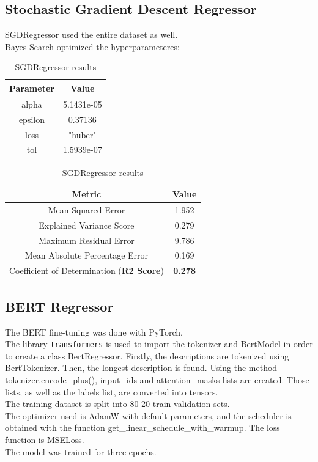 \documentclass[times, utf8, zavrsni, english]{fer}
\begin{document}
\subsection{Stochastic Gradient Descent Regressor}
SGDRegressor used the entire dataset as well. \\
Bayes Search optimized the hyperparameteres:
\begin{table}[h!]
	\parbox{.45\linewidth}{
		\centering
		\begin{tabular}{|| c | c ||} 
			\hline
			Parameter & Value \\ [0.5ex] 
			\hline\hline
			alpha & 5.1431e-05  \\ \hline
			epsilon & 0.37136 \\ \hline
			loss & "huber" \\ \hline
			tol & 1.5939e-07  \\ 
			\hline
		\end{tabular}
		\caption{Hyperparameteres for SGDRegressor}
		\label{table:7}
	}
	\parbox{.45\linewidth}{
		\centering
		\begin{tabular}{|| c | c ||} 
			\hline
			Metric & Value \\ [0.5ex] 
			\hline\hline
			Mean Squared Error & 1.952  \\ \hline
			Explained Variance Score & 0.279\\ \hline
			Maximum Residual Error & 9.786 \\ \hline
			Mean Absolute Percentage Error & 0.169 \\ \hline
			Coefficient of Determination (\textbf{R2 Score}) & \textbf{0.278} \\
			\hline
		\end{tabular}
		\caption{SGDRegressor results}
		\label{table:8}
	}
\end{table}
\subsection{BERT Regressor}
The BERT fine-tuning was done with PyTorch.\\
The library \texttt{transformers} is used to import the tokenizer and BertModel in order to create a class BertRegressor.
Firstly, the descriptions are tokenized using BertTokenizer. Then, the longest description is found. Using the method tokenizer.encode\_plus(), input\_ids and attention\_masks lists are created. Those lists, as well as the labels list, are converted into tensors. \\
The training dataset is split into 80-20 train-validation sets. \\
The optimizer used is AdamW with default parameters, and the scheduler is obtained with the function get\_linear\_schedule\_with\_warmup. 
The loss function is MSELoss.\\
The model was trained for three epochs. 
\end{document}
